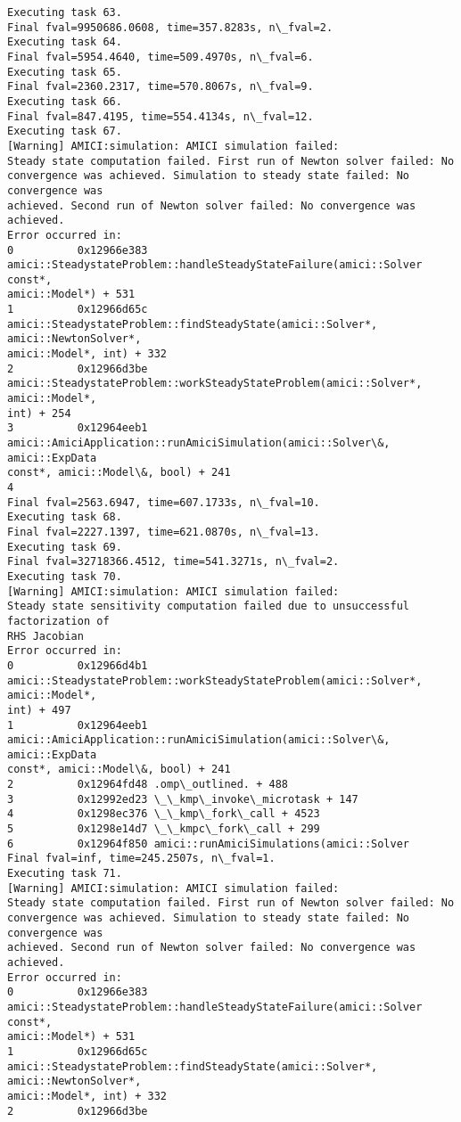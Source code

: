 \documentclass[11pt]{article}
\begin{document}
\begin{Verbatim}[commandchars=\\\{\}]
Executing task 63.
Final fval=9950686.0608, time=357.8283s, n\_fval=2.
Executing task 64.
Final fval=5954.4640, time=509.4970s, n\_fval=6.
Executing task 65.
Final fval=2360.2317, time=570.8067s, n\_fval=9.
Executing task 66.
Final fval=847.4195, time=554.4134s, n\_fval=12.
Executing task 67.
[Warning] AMICI:simulation: AMICI simulation failed:
Steady state computation failed. First run of Newton solver failed: No
convergence was achieved. Simulation to steady state failed: No convergence was
achieved. Second run of Newton solver failed: No convergence was achieved.
Error occurred in:
0          0x12966e383
amici::SteadystateProblem::handleSteadyStateFailure(amici::Solver const*,
amici::Model*) + 531
1          0x12966d65c
amici::SteadystateProblem::findSteadyState(amici::Solver*, amici::NewtonSolver*,
amici::Model*, int) + 332
2          0x12966d3be
amici::SteadystateProblem::workSteadyStateProblem(amici::Solver*, amici::Model*,
int) + 254
3          0x12964eeb1
amici::AmiciApplication::runAmiciSimulation(amici::Solver\&, amici::ExpData
const*, amici::Model\&, bool) + 241
4
Final fval=2563.6947, time=607.1733s, n\_fval=10.
Executing task 68.
Final fval=2227.1397, time=621.0870s, n\_fval=13.
Executing task 69.
Final fval=32718366.4512, time=541.3271s, n\_fval=2.
Executing task 70.
[Warning] AMICI:simulation: AMICI simulation failed:
Steady state sensitivity computation failed due to unsuccessful factorization of
RHS Jacobian
Error occurred in:
0          0x12966d4b1
amici::SteadystateProblem::workSteadyStateProblem(amici::Solver*, amici::Model*,
int) + 497
1          0x12964eeb1
amici::AmiciApplication::runAmiciSimulation(amici::Solver\&, amici::ExpData
const*, amici::Model\&, bool) + 241
2          0x12964fd48 .omp\_outlined. + 488
3          0x12992ed23 \_\_kmp\_invoke\_microtask + 147
4          0x1298ec376 \_\_kmp\_fork\_call + 4523
5          0x1298e14d7 \_\_kmpc\_fork\_call + 299
6          0x12964f850 amici::runAmiciSimulations(amici::Solver
Final fval=inf, time=245.2507s, n\_fval=1.
Executing task 71.
[Warning] AMICI:simulation: AMICI simulation failed:
Steady state computation failed. First run of Newton solver failed: No
convergence was achieved. Simulation to steady state failed: No convergence was
achieved. Second run of Newton solver failed: No convergence was achieved.
Error occurred in:
0          0x12966e383
amici::SteadystateProblem::handleSteadyStateFailure(amici::Solver const*,
amici::Model*) + 531
1          0x12966d65c
amici::SteadystateProblem::findSteadyState(amici::Solver*, amici::NewtonSolver*,
amici::Model*, int) + 332
2          0x12966d3be

\end{Verbatim}
\end{document}
